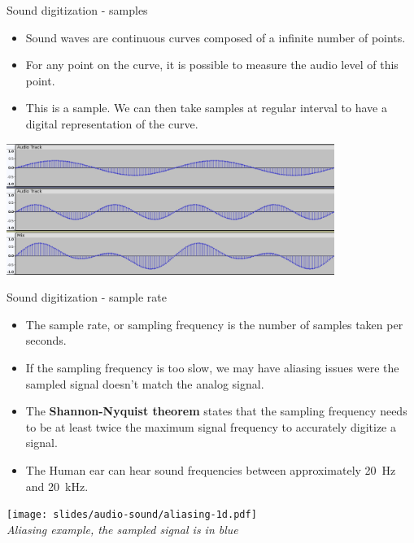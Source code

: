 \begin{frame}{Sound digitization - samples}
  \begin{itemize}
  \item Sound waves are continuous curves composed of a infinite
    number of points.
  \item For any point on the curve, it is possible to measure the
    audio level of this point.
  \item This is a sample. We can then take samples at regular interval
    to have a digital representation of the curve.
  \end{itemize}
  \begin{center}
  \includegraphics[width=0.8\textwidth]{slides/audio-sound/sound-samples.png}
  \end{center}
\end{frame}

\begin{frame}{Sound digitization - sample rate}
  \begin{itemize}
  \item The sample rate, or sampling frequency is the number of
    samples taken per seconds.
  \item If the sampling frequency is too slow, we may have aliasing
    issues were the sampled signal doesn't match the analog signal.
  \item The \textbf{Shannon-Nyquist theorem} states that the sampling
    frequency needs to be at least twice the maximum signal frequency
    to accurately digitize a signal.
  \item The Human ear can hear sound frequencies between approximately
    20~Hz and 20~kHz.
  \end{itemize}
  \begin{center}
  \texttt{[image: slides/audio-sound/aliasing-1d.pdf]}\\
  \textit{\small Aliasing example, the sampled signal is in blue}
  \end{center}
\end{frame}

